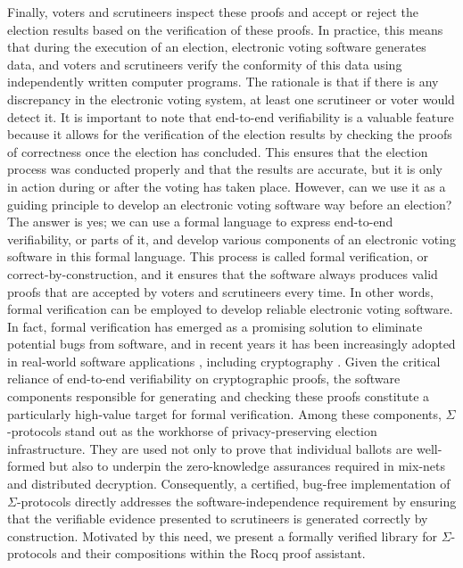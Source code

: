 \documentclass[sigconf, anonymous]{acmart}
\begin{document}
Finally, voters and scrutineers inspect these proofs and accept or reject the election results based on 
the verification of these proofs. In practice, this means that during the execution of an election, 
electronic voting software generates data, and voters and scrutineers verify the conformity of 
this data using independently written computer programs. The rationale is that if there is 
any discrepancy in the electronic voting system, at least one scrutineer or voter would detect it.
It is important to note that end-to-end verifiability is a valuable feature because it 
allows for the verification of the election results by checking the proofs of correctness 
once the election has concluded. This ensures that the election process was conducted 
properly and that the results are accurate, but it is only in action during or after the voting has taken place.
However, can we use it as a guiding principle to develop an electronic voting software way before 
an election? The answer is yes; we can use a formal language to express end-to-end verifiability, or parts of 
it, and develop various components of an electronic voting 
software in this formal language. This process is called formal verification, or correct-by-construction,
and it ensures that the software always produces valid proofs that 
are accepted by voters and scrutineers every time. In other words, formal verification
can be employed to develop reliable electronic voting software.
In fact, formal verification has emerged as a promising solution 
to eliminate potential bugs from software, and in recent years it has been increasingly 
adopted in real-world software applications \cite{10.1145/1111037.1111042}, 
including cryptography \cite{8835346,10.1145/3133956.3134043,190894,10.1145/2701415,
10.1145/2660267.2660370,10.1145/3319535.3363211}. Given the critical reliance of end-to-end verifiability on cryptographic proofs, the software components responsible for generating and checking these proofs constitute a particularly high-value target for formal verification. Among these components, $\Sigma$-protocols stand out as the workhorse of privacy-preserving election infrastructure. 
They are used not only to prove that individual ballots are well-formed but also to underpin the zero-knowledge assurances required in mix-nets and distributed decryption. 
Consequently, a certified, bug-free implementation of $\Sigma$-protocols directly addresses the software-independence requirement by ensuring that the verifiable evidence presented to scrutineers is generated correctly by construction.  Motivated by this need, we present a formally verified library for $\Sigma$-protocols and their compositions within the Rocq proof assistant.
\end{document}
